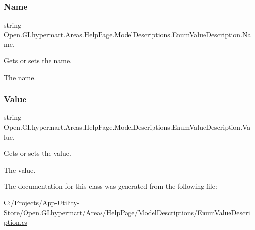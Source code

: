 \subsubsection{\texorpdfstring{Name}{Name}}
{\footnotesize\ttfamily string Open.\+G\+I.\+hypermart.\+Areas.\+Help\+Page.\+Model\+Descriptions.\+Enum\+Value\+Description.\+Name\hspace{0.3cm}{\ttfamily [get]}, {\ttfamily [set]}}



Gets or sets the name. 

The name. \hypertarget{class_open_1_1_g_i_1_1hypermart_1_1_areas_1_1_help_page_1_1_model_descriptions_1_1_enum_value_description_ab94229a6c9c5afad58abc04d705169f8}{}\label{class_open_1_1_g_i_1_1hypermart_1_1_areas_1_1_help_page_1_1_model_descriptions_1_1_enum_value_description_ab94229a6c9c5afad58abc04d705169f8} 
\subsubsection{\texorpdfstring{Value}{Value}}
{\footnotesize\ttfamily string Open.\+G\+I.\+hypermart.\+Areas.\+Help\+Page.\+Model\+Descriptions.\+Enum\+Value\+Description.\+Value\hspace{0.3cm}{\ttfamily [get]}, {\ttfamily [set]}}



Gets or sets the value. 

The value. 

The documentation for this class was generated from the following file\+:\begin{DoxyCompactItemize}
\item 
C\+:/\+Projects/\+App-\/\+Utility-\/\+Store/\+Open.\+G\+I.\+hypermart/\+Areas/\+Help\+Page/\+Model\+Descriptions/\hyperlink{_enum_value_description_8cs}{Enum\+Value\+Description.\+cs}\end{DoxyCompactItemize}
